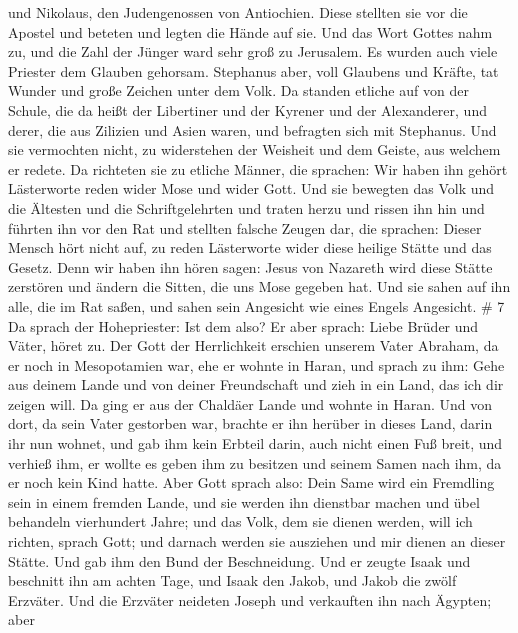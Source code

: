 und Nikolaus, den Judengenossen von Antiochien.  Diese
stellten sie vor die Apostel und beteten und legten die Hände auf sie.
 Und das Wort Gottes nahm zu, und die Zahl der Jünger ward
sehr groß zu Jerusalem. Es wurden auch viele Priester dem Glauben
gehorsam.  Stephanus aber, voll Glaubens und Kräfte, tat
Wunder und große Zeichen unter dem Volk.  Da standen etliche
auf von der Schule, die da heißt der Libertiner und der Kyrener und der
Alexanderer, und derer, die aus Zilizien und Asien waren, und befragten
sich mit Stephanus.  Und sie vermochten nicht, zu
widerstehen der Weisheit und dem Geiste, aus welchem er redete.
 Da richteten sie zu etliche Männer, die sprachen: Wir
haben ihn gehört Lästerworte reden wider Mose und wider Gott.
 Und sie bewegten das Volk und die Ältesten und die
Schriftgelehrten und traten herzu und rissen ihn hin und führten ihn vor
den Rat  und stellten falsche Zeugen dar, die sprachen:
Dieser Mensch hört nicht auf, zu reden Lästerworte wider diese heilige
Stätte und das Gesetz.  Denn wir haben ihn hören sagen:
Jesus von Nazareth wird diese Stätte zerstören und ändern die Sitten,
die uns Mose gegeben hat.  Und sie sahen auf ihn alle, die
im Rat saßen, und sahen sein Angesicht wie eines Engels Angesicht. \# 7
 Da sprach der Hohepriester: Ist dem also?  Er
aber sprach: Liebe Brüder und Väter, höret zu. Der Gott der Herrlichkeit
erschien unserem Vater Abraham, da er noch in Mesopotamien war, ehe er
wohnte in Haran,  und sprach zu ihm: Gehe aus deinem Lande
und von deiner Freundschaft und zieh in ein Land, das ich dir zeigen
will.  Da ging er aus der Chaldäer Lande und wohnte in
Haran. Und von dort, da sein Vater gestorben war, brachte er ihn herüber
in dieses Land, darin ihr nun wohnet,  und gab ihm kein
Erbteil darin, auch nicht einen Fuß breit, und verhieß ihm, er wollte es
geben ihm zu besitzen und seinem Samen nach ihm, da er noch kein Kind
hatte.  Aber Gott sprach also: Dein Same wird ein Fremdling
sein in einem fremden Lande, und sie werden ihn dienstbar machen und
übel behandeln vierhundert Jahre;  und das Volk, dem sie
dienen werden, will ich richten, sprach Gott; und darnach werden sie
ausziehen und mir dienen an dieser Stätte.  Und gab ihm den
Bund der Beschneidung. Und er zeugte Isaak und beschnitt ihn am achten
Tage, und Isaak den Jakob, und Jakob die zwölf Erzväter. 
Und die Erzväter neideten Joseph und verkauften ihn nach Ägypten; aber
